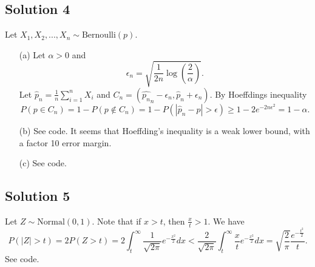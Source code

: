 \subsection*{Solution 4}

Let $X_1, X_2, ..., X_n \sim \mathrm{Bernoulli}(p)$.

\begin{itemize}
\item[(a)] Let $\alpha > 0$ and
\begin{equation*}
\epsilon_n = \sqrt{\frac{1}{2n} \log\left(\frac{2}{\alpha}\right)}.
\end{equation*}
Let $\hat{p}_n = \frac{1}{n}\sum_{i=1}^n X_i$ and $C_n = (\hat{p_n}_n - \epsilon_n, \hat{p}_n + \epsilon_n)$.
By Hoeffdings inequality
\begin{equation*}
P(p \in C_n) = 1 - P(p \notin C_n)
    = 1 - P(|\hat{p}_n - p| > \epsilon)
    \geq 1 - 2e^{-2n\epsilon^2}
    = 1 - \alpha.
\end{equation*}
\item[(b)] See code. It seems that Hoeffding's inequality is a weak lower bound, with a factor 10 error margin.
\item[(c)] See code.
\end{itemize}


\subsection*{Solution 5}

Let $Z \sim \mathrm{Normal}(0, 1)$.
Note that if $x > t$, then $\frac{x}{t} > 1$.
We have
\begin{equation*}
    P(|Z| > t) = 2P(Z > t)
        = 2 \int_t^{\infty} \frac{1}{\sqrt{2\pi}} e^{-\frac{x^2}{2}} dx
        < \frac{2}{\sqrt{2\pi}} \int_t^{\infty} \frac{x}{t} e^{-\frac{x^2}{2}} dx
        = \sqrt{\frac{2}{\pi}} \frac{e^{-\frac{t^2}{2}}}{t}.
\end{equation*}
See code.
